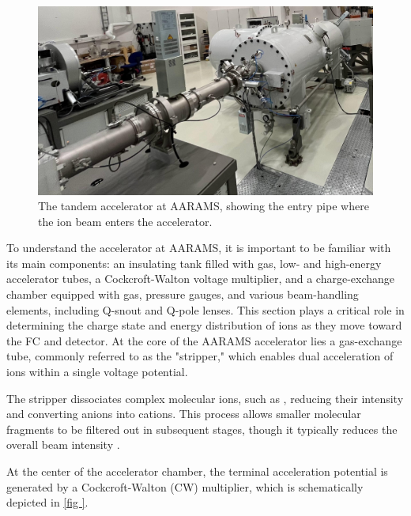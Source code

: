\begin{figure}[ht] \centering \includegraphics[width=\linewidth]{B/acceleratorphoto.pdf} \caption{The  tandem accelerator at AARAMS, showing the entry pipe where the ion beam enters the accelerator.} \label{fig:acceleratorphoto.pdf} \end{figure}

To understand the accelerator at AARAMS, it is important to be familiar with its main components: an insulating tank filled with  gas, low- and high-energy accelerator tubes, a Cockcroft-Walton voltage multiplier, and a charge-exchange chamber equipped with gas, pressure gauges, and various beam-handling elements, including Q-snout and Q-pole lenses. This section plays a critical role in determining the charge state and energy distribution of ions as they move toward the FC and detector. At the core of the AARAMS accelerator lies a gas-exchange tube, commonly referred to as the "stripper," which enables dual acceleration of ions within a single voltage potential.

The stripper dissociates complex molecular ions, such as , reducing their intensity and converting anions into cations. This process allows smaller molecular fragments to be filtered out in subsequent stages, though it typically reduces the overall beam intensity \cite{weisser2005stripper}.

At the center of the accelerator chamber, the terminal acceleration potential is generated by a Cockcroft-Walton (CW) multiplier, which is schematically depicted in \cref{fig
}.

